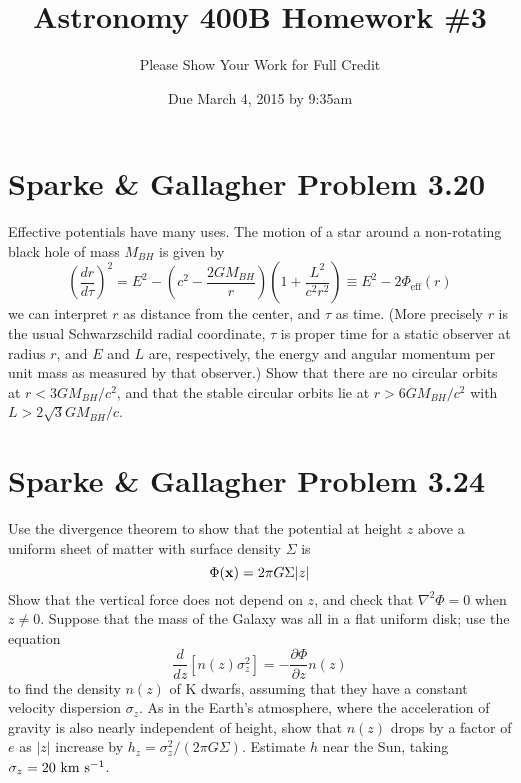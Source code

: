 \documentclass[]{article}
\title{Astronomy 400B Homework \#3}
\author{Please Show Your Work for Full Credit}
\date{Due March 4, 2015 by 9:35am}
\begin{document}
\maketitle

\section{Sparke \& Gallagher Problem 3.20}

Effective potentials have many uses. The motion of a star around
a non-rotating black hole of mass $M_{BH}$ is given by
\begin{equation}
\left(\frac{dr}{d\tau}\right)^2 = E^2 - \left(c^2 - \frac{2GM_{BH}}{r}\right)\left(1 + \frac{L^2}{c^2 r^2}\right) \equiv E^2 - 2\Phi_{\mathrm{eff}}(r)
\end{equation}
\noindent
we can interpret $r$ as distance from the center, and $\tau$ as time. (More precisely $r$ is the usual Schwarzschild radial coordinate, $\tau$ is proper time for a static observer at radius $r$, and $E$ and $L$ are, respectively, the energy and angular momentum per unit mass as measured by that observer.) Show that there are no circular orbits at $r<3GM_{BH}/c^2$, and that the stable circular orbits lie at $r>6GM_{BH}/c^2$ with $L>2\sqrt{3}GM_{BH}/c$.

\section{Sparke \& Gallagher Problem 3.24}

Use the divergence theorem to show that the potential at height $z$ above a uniform sheet of matter with surface density $\Sigma$ is
\begin{equation}
\Phi(\mathbf{x}) = 2 \pi G \Sigma|z|
\end{equation}
\noindent
Show that the vertical force does not depend on $z$, and check that $\nabla^2\Phi=0$ when $z\ne0$. Suppose that the mass of the Galaxy was all in a flat uniform disk; use the equation
\begin{equation}
\frac{d}{dz}\left[n(z)\sigma_z^2\right] = - \frac{\partial\Phi}{\partial z} n(z)
\end{equation}
\noindent
to find the density $n(z)$ of K dwarfs, assuming that they have a constant velocity dispersion $\sigma_z$. As in the Earth's atmosphere, where the acceleration of gravity is also nearly independent of height, show that $n(z)$ drops by a factor of $e$ as $|z|$ increase by $h_z = \sigma_z^2 / (2\pi G \Sigma)$. Estimate $h$ near the Sun, taking $\sigma_z = 20~\mathrm{km}~\mathrm{s}^{-1}$.
\end{document}
